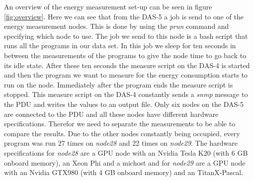 An overview of the energy measurement set-up can be seen in figure \ref{fig:overview}. Here we can see that from the DAS-5 a job is send to one of the energy measurement nodes. This is done by using the \textit{prun} command and specifying which node to use. The job we send to this node is a bash script that runs all the programs in our data set. In this job we sleep for ten seconds in between the measurements of the programs to give the node time to go back to its idle state. After these ten seconds the measure script on the DAS-4 is started and then the program we want to measure for the energy consumption starts to run on the node. Immediately after the program ends the measure script is stopped. This measure script on the DAS-4 constantly sends a \textit{snmp} message to the PDU and writes the values to an output file. Only six nodes on the DAS-5 are connected to the PDU and all these nodes have different hardware specifications. Therefor we need to separate the measurements to be able to compare the results. Due to the other nodes constantly being occupied, every program was run 27 times on \textit{node28} and 22 times on \textit{node29}. The hardware specifications for \textit{node28} are a GPU node with an Nvidia Tesla K20 (with 6 GB onboard memory), an Xeon Phi and a michost and for \textit{node29} are a GPU node with an Nvidia GTX980 (with 4 GB onboard memory) and an TitanX-Pascal.


